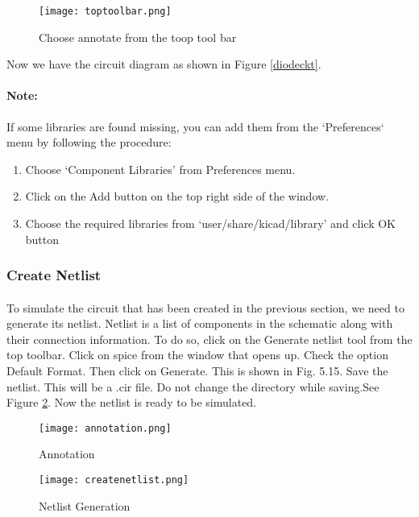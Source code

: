 \begin{figure}[H]
\centering
\texttt{[image: toptoolbar.png]}
\caption{Choose annotate from the toop tool bar}
\label{toptoolbar}
\end{figure}



Now we have the circuit diagram as shown in Figure \ref{diodeckt}.


\paragraph{Note:} If some libraries are found missing, you can add them from the `Preferences` menu by following the procedure: 

\begin{enumerate}
\item
Choose `Component Libraries' from Preferences menu.

\item
Click on the Add button on the top right side of the window.

\item
Choose the required libraries from `user/share/kicad/library' and click OK button

\end{enumerate}

\subsubsection{Create Netlist}

\paragraph{}To simulate the circuit that has been created in the previous section, we need to generate
its netlist. Netlist is a list of components in the schematic along with their connection
information. To do so, click on the Generate netlist tool from the top toolbar. Click on
spice from the window that opens up. Check the option Default Format. Then click
on Generate. This is shown in Fig. 5.15. Save the netlist. This will be a .cir file. Do
not change the directory while saving.See Figure \ref{createnetlist}.
 Now the netlist is ready to be simulated. 
\begin{figure}
\begin{minipage}{.5\textwidth}
  \centering
  \texttt{[image: annotation.png]}
  \caption{Annotation}
  \label{annotation}
\end{minipage}%
\begin{minipage}{.5\textwidth}
  \centering
  \texttt{[image: createnetlist.png]}
  \caption{Netlist Generation}
  \label{createnetlist}
\end{minipage}
\end{figure}

